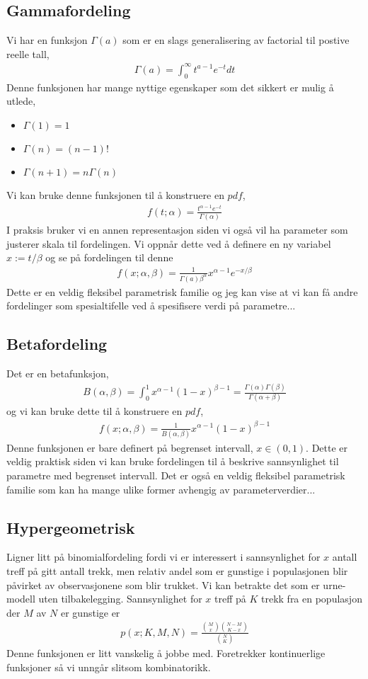 \subsection{Gammafordeling}
Vi har en funksjon $\Gamma(a)$ som er en slags generalisering av factorial til postive reelle tall,
\begin{align}
\Gamma(a)=\int_0^{\infty}t^{a-1}e^{-t}dt
\end{align}
Denne funksjonen har mange nyttige egenskaper som det sikkert er mulig å utlede,
\begin{itemize}
\item $\Gamma(1)=1$
\item $\Gamma(n)=(n-1)!$
\item $\Gamma(n+1) = n\Gamma(n)$
\end{itemize}
Vi kan bruke denne funksjonen til å konstruere en $pdf$,
\begin{align}
f(t;\alpha) = \frac{t^{\alpha-1}e^{-t}}{\Gamma(\alpha)}
\end{align}
I praksis bruker vi en annen representasjon siden vi også vil ha parameter som justerer skala til fordelingen. Vi oppnår dette ved å definere en ny variabel $x:=t/\beta$ og se på fordelingen til denne
\begin{align}
f(x;\alpha,\beta)=\frac{1}{\Gamma(a)\beta^\alpha}x^{\alpha-1}e^{-x/\beta}
\end{align}
Dette er en veldig fleksibel parametrisk familie og jeg kan vise at vi kan få andre fordelinger som spesialtifelle ved å spesifisere verdi på parametre...
\subsection{Betafordeling}
Det er en betafunksjon,
\begin{align}
B(\alpha,\beta)=\int_0^1x^{\alpha-1}(1-x)^{\beta-1} = \frac{\Gamma(\alpha)\Gamma(\beta)}{\Gamma(\alpha+\beta)}
\end{align}
og vi kan bruke dette til å konstruere en $pdf$,
\begin{align}
f(x;\alpha,\beta) = \frac{1}{B(\alpha,\beta)}x^{\alpha-1}(1-x)^{\beta-1}
\end{align}
Denne funksjonen er bare definert på begrenset intervall, $x\in (0,1)$. Dette er veldig praktisk siden vi kan bruke fordelingen til å beskrive sannsynlighet til parametre med begrenset intervall. Det er også en veldig fleksibel parametrisk familie som kan ha mange ulike former avhengig av parameterverdier...
\subsection{Hypergeometrisk}
Ligner litt på binomialfordeling fordi vi er interessert i sannsynlighet for $x$ antall treff på gitt antall trekk, men relativ andel som er gunstige i populasjonen blir påvirket av observasjonene som blir trukket. Vi kan betrakte det som er urne-modell uten tilbakelegging. Sannsynlighet for $x$ treff på $K$ trekk fra en populasjon der $M$ av $N$ er gunstige er
\begin{align}
p(x;K,M,N) = \frac{\binom{M}{x}\binom{N-M}{K-x}}{\binom{N}{K}}
\end{align}
Denne funksjonen er litt vanskelig å jobbe med. Foretrekker kontinuerlige funksjoner så vi unngår slitsom kombinatorikk.